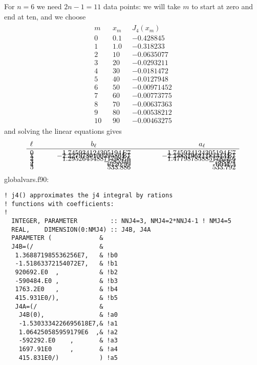 \documentclass[preprint,12pt,eqsecnum,nofootinbib,amsmath,amssymb]{revtex4}
\begin{document}
\noindent
For $n=6$ we need $2n-1=11$ data points: we will take
$m$ to start at zero and end at ten, and we choose 
\begin{eqnarray}
\begin{array}{lll}
  m~~~~& x_m~~~   & J_4(x_m)        \\ \hline
  0    & 0.1      &    -0.428845    \\[-8pt]
  1    & 1.0      &    -0.318233    \\[-8pt]
  2    & 10       &    -0.0635077   \\[-8pt]
  3    & 20       &    -0.0293211   \\[-8pt]
  4    & 30       &    -0.0181472   \\[-8pt]
  5    & 40       &    -0.0127948   \\[-8pt]
  6    & 50       &    -0.00971452  \\[-8pt]
  7    & 60       &    -0.00773775  \\[-8pt]
  8    & 70       &    -0.00637363  \\[-8pt]
  9    & 80       &    -0.00538212  \\[-8pt]
 10    & 90       &    -0.00463275
\end{array}
\end{eqnarray}
%
and solving the linear equations gives
\begin{eqnarray}
  \begin{array}{lrr}
  \ell~~~~~~~ & \hfill b_\ell \hfill & \hskip3cm a_\ell \hskip1.5cm  \\ \hline
  0    &   1.745934124305194E7    &  1.745934124305194E7     \\[-8pt]
  1    &  -2.227978010029586E7    & -2.238319621183343E7     \\[-8pt]
  2    &   1.295264548871798E6    &  1.477987858851782E6     \\[-8pt]
  3    &               -785340    &              -788364     \\[-8pt]
  4    &               6120.99    &               6041.5     \\[-8pt]
  5    &                533.886   &              533.792     \\[-8pt]
  \end{array}
\end{eqnarray}


{\noindent
globalvars.f90:
\baselineskip12pt
\begin{verbatim}
! j4() approximates the j4 integral by rations
! functions with coefficients:
!
  INTEGER, PARAMETER         :: NNJ4=3, NMJ4=2*NNJ4-1 ! NMJ4=5
  REAL,    DIMENSION(0:NMJ4) :: J4B, J4A
  PARAMETER (             &
  J4B=(/                  &
   1.368871985536256E7,   & !b0
   -1.51863372154072E7,   & !b1
   920692.E0  ,           & !b2
   -590484.E0 ,           & !b3
   1763.2E0   ,           & !b4
   415.931E0/),           & !b5
   J4A=(/                 &
    J4B(0),               & !a0
    -1.5303334226695618E7,& !a1
    1.064250585959179E6  ,& !a2
    -592292.E0    ,       & !a3
    1697.91E0     ,       & !a4
    415.831E0/)           ) !a5
\end{verbatim}
}
\end{document}
